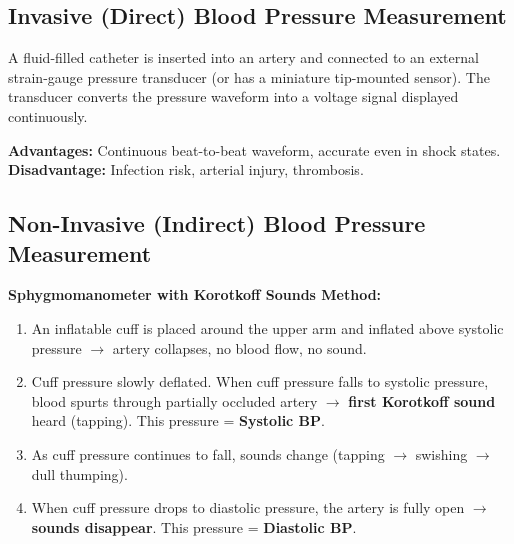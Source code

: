 \documentclass[12pt,a4paper]{article}
\begin{document}
\subsection{Invasive (Direct) Blood Pressure Measurement}

A fluid-filled catheter is inserted into an artery and connected to an external strain-gauge pressure transducer (or has a miniature tip-mounted sensor). The transducer converts the pressure waveform into a voltage signal displayed continuously.

\textbf{Advantages:} Continuous beat-to-beat waveform, accurate even in shock states. \\
\textbf{Disadvantage:} Infection risk, arterial injury, thrombosis.

\subsection{Non-Invasive (Indirect) Blood Pressure Measurement}

\textbf{Sphygmomanometer with Korotkoff Sounds Method:}
\begin{enumerate}[leftmargin=*, itemsep=3pt]
  \item An inflatable cuff is placed around the upper arm and inflated above systolic pressure $\to$ artery collapses, no blood flow, no sound.
  \item Cuff pressure slowly deflated. When cuff pressure falls to systolic pressure, blood spurts through partially occluded artery $\to$ \textbf{first Korotkoff sound} heard (tapping). This pressure = \textbf{Systolic BP}.
  \item As cuff pressure continues to fall, sounds change (tapping $\to$ swishing $\to$ dull thumping).
  \item When cuff pressure drops to diastolic pressure, the artery is fully open $\to$ \textbf{sounds disappear}. This pressure = \textbf{Diastolic BP}.
\end{enumerate}
\end{document}
